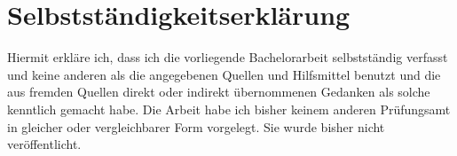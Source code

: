 \chapter*{Selbstständigkeitserklärung}


Hiermit erkläre ich, dass ich die vorliegende Bachelorarbeit selbstständig verfasst und keine anderen als die angegebenen Quellen und Hilfsmittel benutzt und die aus fremden Quellen direkt oder indirekt übernommenen Gedanken als solche kenntlich gemacht habe. Die Arbeit habe ich bisher keinem anderen Prüfungsamt in gleicher oder vergleichbarer Form vorgelegt. Sie wurde bisher nicht veröffentlicht.


\vspace{1cm}


\par\noindent{}
\hfill\makebox[.4\textwidth]{}

\par\noindent\makebox[.55\textwidth]{\hrulefill}
\hfill\makebox[.4\textwidth]{\hrulefill}

\par\noindent{}
\hfill\makebox[.4\textwidth][l]{\Author}
